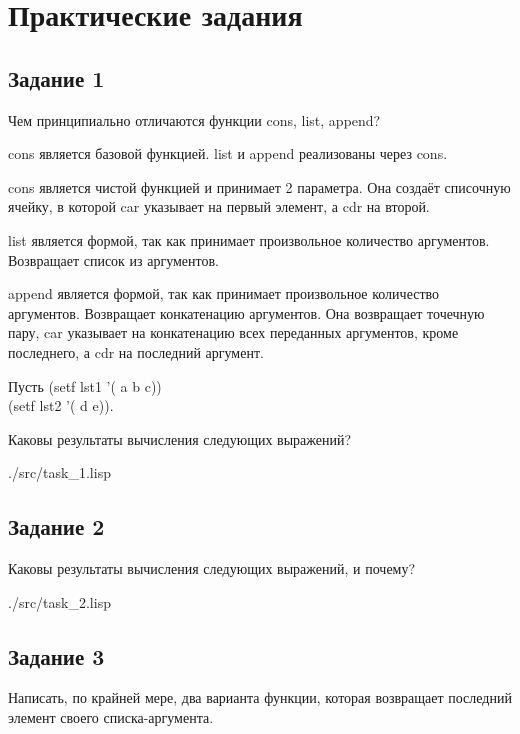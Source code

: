 \chapter*{Практические задания}

\section*{Задание 1}

Чем принципиально отличаются функции cons, list, append?

cons является базовой функцией. list и append реализованы через cons.

cons является чистой функцией и принимает 2 параметра. Она создаёт списочную ячейку, в которой car указывает на первый элемент, а cdr на второй.

list является формой, так как принимает произвольное количество аргументов. Возвращает список из аргументов.

append является формой, так как принимает произвольное количество аргументов. Возвращает конкатенацию аргументов. Она возвращает точечную пару, car указывает на конкатенацию всех переданных аргументов, кроме последнего, а cdr на последний аргумент.

Пусть (setf lst1 '( a b c)) \\
(setf lst2 '( d e)). 

Каковы результаты вычисления следующих выражений?

\begin{lstinputlisting}[
	caption={Задание 1},
	label={lst:t1},
	style={lsp},
	]{./src/task_1.lisp}
\end{lstinputlisting}

\clearpage

\section*{Задание 2}

Каковы результаты вычисления следующих выражений, и почему?

\begin{lstinputlisting}[
	caption={Задание 2},
	label={lst:t2},
	style={lsp},
	]{./src/task_2.lisp}
\end{lstinputlisting}

\section*{Задание 3}

Написать, по крайней мере, два варианта функции, которая возвращает последний элемент своего списка-аргумента. 

